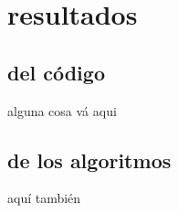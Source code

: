 \newpage 
 \section{resultados}
 \subsection{del código}
  alguna cosa vá aqui
 \subsection{de los algoritmos}
 aquí también
 \newpage

